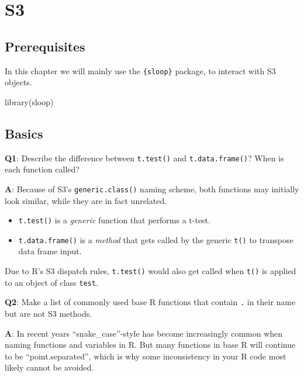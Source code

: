 \documentclass[
]{krantz}
\makeatletter
\newenvironment{Shaded}{\begin{snugshade}}{\end{snugshade}}
\newcommand{\KeywordTok}[1]{\textcolor[rgb]{0.13,0.29,0.53}{\textbf{#1}}}
\newcommand{\NormalTok}[1]{#1}
\providecommand{\tightlist}{%
  \setlength{\itemsep}{0pt}\setlength{\parskip}{0pt}}
\newenvironment{kframe}{%
\medskip{}
\setlength{\fboxsep}{.8em}
 \def\at@end@of@kframe{}%
 \ifinner\ifhmode%
  \def\at@end@of@kframe{\end{minipage}}%
  \begin{minipage}{\columnwidth}%
 \fi\fi%
 \def\FrameCommand##1{\hskip\@totalleftmargin \hskip-\fboxsep
 \colorbox{shadecolor}{##1}\hskip-\fboxsep
     \hskip-\linewidth \hskip-\@totalleftmargin \hskip\columnwidth}%
 \MakeFramed {\advance\hsize-\width
   \@totalleftmargin\z@ \linewidth\hsize
   \@setminipage}}%
 {\par\unskip\endMakeFramed%
 \at@end@of@kframe}
\renewenvironment{Shaded}{\begin{kframe}}{\end{kframe}}
\renewcommand{\KeywordTok} [1]{\textcolor[rgb]{0.00,0.44,0.13}{{#1}}}
\renewcommand{\NormalTok}  [1]{{#1}}
\makeatother
\begin{document}

\hypertarget{s3}{%
\chapter{S3}\label{s3}}

\hypertarget{prerequisites-6}{%
\section*{Prerequisites}\label{prerequisites-6}}


In this chapter we will mainly use the \texttt{\{sloop\}} package, to interact with S3 objects.

\begin{Shaded}
\begin{Highlighting}[]
\KeywordTok{library}\NormalTok{(sloop)}
\end{Highlighting}
\end{Shaded}


\hypertarget{basics}{%
\section{Basics}\label{basics}}

\textbf{{Q1}}: Describe the difference between \texttt{t.test()} and \texttt{t.data.frame()}? When is each function called?

\textbf{{A}}: Because of S3's \texttt{generic.class()} naming scheme, both functions may initially look similar, while they are in fact unrelated.

\begin{itemize}
\tightlist
\item
  \texttt{t.test()} is a \emph{generic} function that performs a t-test.
\item
  \texttt{t.data.frame()} is a \emph{method} that gets called by the generic \texttt{t()} to transpose data frame input.
\end{itemize}

Due to R's S3 dispatch rules, \texttt{t.test()} would also get called when \texttt{t()} is applied to an object of class \texttt{test}.

\textbf{{Q2}}: Make a list of commonly used base R functions that contain \texttt{.} in their name but are not S3 methods.

\textbf{{A}}: In recent years ``snake\_case''-style has become increasingly common when naming functions and variables in R. But many functions in base R will continue to be ``point.separated'', which is why some inconsistency in your R code most likely cannot be avoided.
\end{document}
